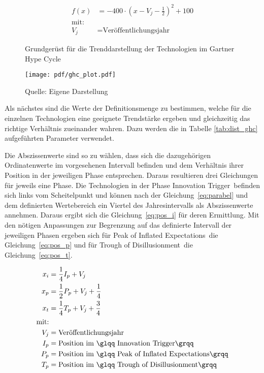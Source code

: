 \begin{align}
f(x) &= -400 \cdot \left( x - V_j - \frac{1}{2} \right)^2+100 \label{eq:parabel}\\
\text{mit:}\nonumber\\
V_j &= \text{Veröffentlichungsjahr}\nonumber
\end{align}

\begin{figure}
	\centering
	\caption{Grundgerüst für die Trenddarstellung der Technologien im \glqq Gartner Hype Cycle\grqq}
	\texttt{[image: pdf/ghc\_plot.pdf]}
	\caption*{Quelle: Eigene Darstellung}
	\label{fig:ghc_plot}
\end{figure}

Als nächstes sind die Werte der Definitionsmenge zu bestimmen, welche für die einzelnen Technologien eine geeignete Trendstärke ergeben und gleichzeitig das richtige Verhältnis zueinander wahren. Dazu werden die in Tabelle \ref{tab:dist_ghc} aufgeführten Parameter verwendet.

Die Abszissenwerte sind so zu wählen, dass sich die dazugehörigen Ordinatenwerte im vorgesehenen Intervall befinden und dem Verhältnis ihrer Position in der jeweiligen Phase entsprechen. Daraus resultieren drei Gleichungen für jeweils eine Phase. Die Technologien in der Phase \glqq Innovation Trigger\grqq~befinden sich links vom Scheitelpunkt und können nach der Gleichung~\ref{eq:parabel} und dem definierten Wertebereich ein Viertel des Jahresintervalls als Abszissenwerte annehmen. Daraus ergibt sich die Gleichung~\ref{eq:pos_i} für deren Ermittlung. Mit den nötigen Anpassungen zur Begrenzung auf das definierte Intervall der jeweiligen Phasen ergeben sich für \glqq Peak of Inflated Expectations\grqq~die Gleichung~\ref{eq:pos_p} und für \glqq Trough of Disillusionment\grqq~die Gleichung~\ref{eq:pos_t}.

\begin{align}
x_i &= \frac{1}{4}I_p+V_j \label{eq:pos_i}\\
x_p &= \frac{1}{2}P_p+V_j+\frac{1}{4} \label{eq:pos_p}\\
x_t &= \frac{1}{4}T_p+V_j+\frac{3}{4} \label{eq:pos_t}\\
\text{mit:}\nonumber\\
V_j &= \text{Veröffentlichungsjahr}\nonumber\\
I_p &= \text{Position im \glqq Innovation Trigger\grqq}\nonumber\\
P_p &= \text{Position im \glqq Peak of Inflated Expectations\grqq}\nonumber\\
T_p &= \text{Position im \glqq Trough of Disillusionment\grqq}\nonumber
\end{align}


